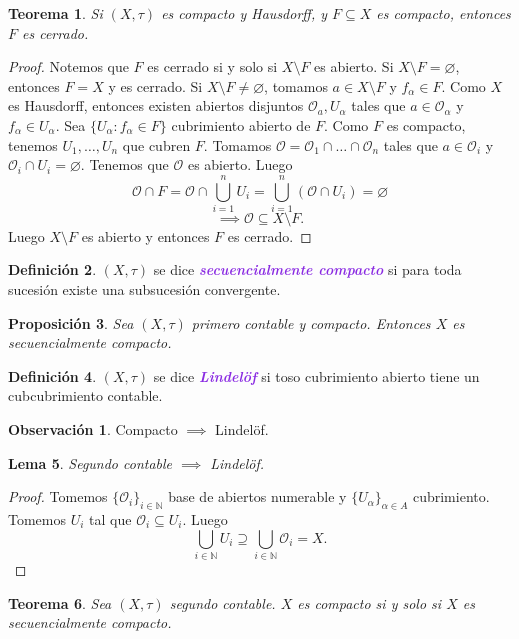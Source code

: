 \documentclass{article}
\newtheorem{theorem}{Teorema}[subsection]
\newtheorem{proposition}[theorem]{Proposición}
\newtheorem{lemma}[theorem]{Lema}
\theoremstyle{definition}
\newtheorem{definition}[theorem]{Definición}
\newtheorem*{obs}{Observación}
\theoremstyle{remark}
\numberwithin{equation}{section}
\newcommand{\N}{\mathbb{N}}
\renewcommand{\O}{\mathcal{O}}
\renewcommand{\a}{\alpha}
\renewcommand{\t}{\tau}
\newcommand{\wea}[1]{\textcolor{BlueViolet}{\textbf{\emph{#1}}}}
\begin{document}
\begin{theorem}
  Si $(X,\t)$ es compacto y Hausdorff, y $F \subseteq X$ es compacto, entonces $F$ es cerrado.
\end{theorem}
\begin{proof}
  Notemos que $F$ es cerrado si y solo si $X \setminus F$ es abierto. Si $X \setminus F = \varnothing$, entonces $F=X$ y  es cerrado. Si $X \setminus F \neq \varnothing$, tomamos $a \in X \setminus F$ y $f_\a \in F$. Como $X$ es Hausdorff, entonces existen abiertos disjuntos $\O_a, U_\a$ tales que $a \in \O_\a$ y $f_\a \in U_\a$.
  Sea $\{U_\a \colon f_\a \in F\}$ cubrimiento abierto de $F$. Como $F$ es compacto, tenemos $U_1,\dots,U_n$ que cubren $F$.
  Tomamos $\O = \O_1 \cap \dots \cap \O_n$ tales que $a \in \O_i$ y $\O_i \cap U_i = \varnothing$. Tenemos que $\O$ es abierto. Luego
  \[\O \cap F = \O \cap \bigcup_{i=1}^n U_i = \bigcup_{i=1}^n (\O \cap U_i) = \varnothing\]
  \[\implies \O \subseteq X \setminus F.\]
  Luego $X \setminus F$ es abierto y entonces $F$ es cerrado.
\end{proof}

\begin{definition}
  $(X,\t)$ se dice \wea{secuencialmente compacto} si para toda sucesión existe una subsucesión convergente.
\end{definition}

\begin{proposition}
  Sea $(X,\t)$ primero contable y compacto. Entonces $X$ es secuencialmente compacto.
\end{proposition}

\begin{definition}
  $(X,\t)$ se dice \wea{Lindelöf} si toso cubrimiento abierto tiene un cubcubrimiento contable.
\end{definition}

\begin{obs}
  Compacto $\implies$ Lindelöf.
\end{obs}

\begin{lemma}
  Segundo contable $\implies$ Lindelöf.
\end{lemma}
\begin{proof}
  Tomemos $\{\O_i\}_{i\in\N}$ base de abiertos numerable y $\{U_\a\}_{\a \in A}$ cubrimiento. Tomemos $U_i$ tal que $\O_i \subseteq U_i$. Luego
  \[\bigcup_{i\in\N} U_i \supseteq \bigcup_{i\in\N} \O_i = X.\]
\end{proof}

\begin{theorem}
  Sea $(X,\t)$ segundo contable. $X$ es compacto si y solo si $X$ es secuencialmente compacto.
\end{theorem}
\end{document}
